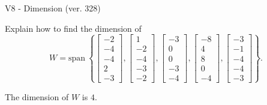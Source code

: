 \begin{exercise}
  \begin{exerciseTitle}V8 - Dimension (ver. 328)\end{exerciseTitle}
  \begin{exerciseStatement}
    Explain how to find the dimension of 
\[W=\mathrm{span}\ \left\{\left[\begin{array}{r}
-2 \\
-4 \\
-4 \\
2 \\
-3
\end{array}\right] , \left[\begin{array}{r}
1 \\
-2 \\
-4 \\
-3 \\
-2
\end{array}\right] , \left[\begin{array}{r}
-3 \\
0 \\
0 \\
-3 \\
-4
\end{array}\right] , \left[\begin{array}{r}
-8 \\
4 \\
8 \\
0 \\
-4
\end{array}\right] , \left[\begin{array}{r}
-3 \\
-1 \\
-4 \\
-4 \\
-3
\end{array}\right]\right\}.\]



  \end{exerciseStatement}
  \begin{exerciseAnswer}
   The dimension of \(W\) is  \(4\).
  


  \end{exerciseAnswer}
\end{exercise}